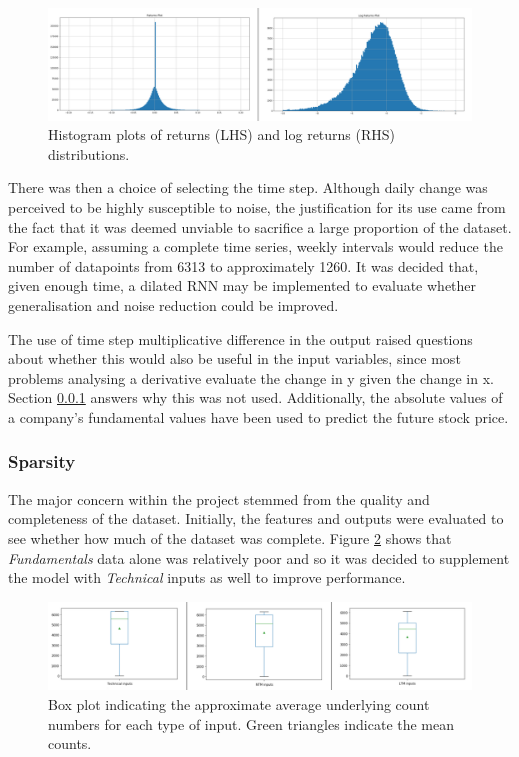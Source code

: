 \documentclass[10pt,onecolumn,letterpaper]{article}
\begin{document}
\begin{figure}[!hbt!]
\centering
\includegraphics[width=\columnwidth]{returns_distribution.png}
\caption{Histogram plots of returns (LHS) and log returns (RHS) distributions.}
\label{returns}
\end{figure}

There was then a choice of selecting the time step. Although daily change was perceived to be highly susceptible to noise, the justification for its use came from the fact that it was deemed unviable to sacrifice a large proportion of the dataset. For example, assuming a complete time series, weekly intervals would reduce the number of datapoints from 6313 to approximately 1260. It was decided that, given enough time, a dilated RNN may be implemented to evaluate whether generalisation and noise reduction could be improved. 

The use of time step multiplicative difference in the output raised questions about whether this would also be useful in the input variables, since most problems analysing a derivative evaluate the change in y given the change in x. Section \ref{data_analysis} answers why this was not used. Additionally, the absolute values of a company's fundamental values have been used to predict the future stock price.

\subsubsection{Sparsity} \label{data_analysis}

The major concern within the project stemmed from the quality and completeness of the dataset. Initially, the features and outputs were evaluated to see whether how much of the dataset was complete. Figure \ref{input_counts} shows that \textit{Fundamentals} data alone was relatively poor and so it was decided to supplement the model with \textit{Technical} inputs as well to improve performance. 

\begin{figure}[!hbt!]
\centering
\includegraphics[width=\columnwidth]{input_counts.png}
\caption{Box plot indicating the approximate average underlying count numbers for each type of input. Green triangles indicate the mean counts.}
\label{input_counts}
\end{figure}
\end{document}
